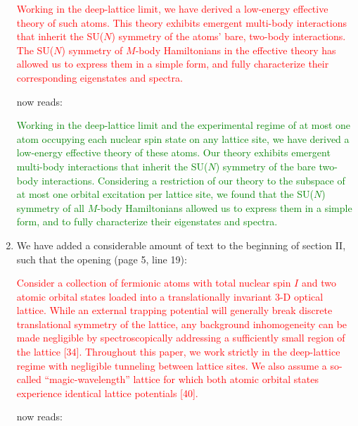 \documentclass[preprint,showkeys,nofootinbib]{revtex4-1}
\newcommand{\1}{\mathds{1}}
\newcommand{\red}[1]{\textcolor{red}{#1}}
\newcommand{\green}[1]{\textcolor{green}{#1}}
\newcounter{point}
\begin{document}
\begin{enumerate}[label=(R1.\arabic{point}.\arabic*)]
  \red{Working in the deep-lattice limit, we have derived a low-energy
    effective theory of such atoms.  This theory exhibits emergent
    multi-body interactions that inherit the SU($N$) symmetry of the
    atoms' bare, two-body interactions.  The SU($N$) symmetry of
    $M$-body Hamiltonians in the effective theory has allowed us to
    express them in a simple form, and fully characterize their
    corresponding eigenstates and spectra.}

  now reads:

  \green{Working in the deep-lattice limit and the experimental regime
    of at most one atom occupying each nuclear spin state on any
    lattice site, we have derived a low-energy effective theory of
    these atoms.  Our theory exhibits emergent multi-body interactions
    that inherit the SU($N$) symmetry of the bare two-body
    interactions.  Considering a restriction of our theory to the
    subspace of at most one orbital excitation per lattice site, we
    found that the SU($N$) symmetry of all $M$-body Hamiltonians
    allowed us to express them in a simple form, and to fully
    characterize their eigenstates and spectra.}

\item We have added a considerable amount of text to the beginning of
  section II, such that the opening (page 5, line 19):

  \red{Consider a collection of fermionic atoms with total nuclear
    spin $I$ and two atomic orbital states loaded into a
    translationally invariant 3-D optical lattice.  While an external
    trapping potential will generally break discrete translational
    symmetry of the lattice, any background inhomogeneity can be made
    negligible by spectroscopically addressing a sufficiently small
    region of the lattice [34].  Throughout this paper, we work
    strictly in the deep-lattice regime with negligible tunneling
    between lattice sites.  We also assume a so-called
    ``magic-wavelength'' lattice for which both atomic orbital states
    experience identical lattice potentials [40].}

  now reads:


\end{enumerate}
\end{document}
